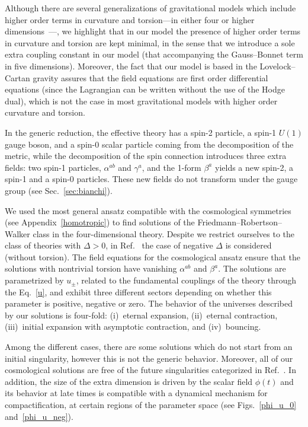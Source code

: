 \documentclass[aps,prd,12pt,superscriptaddress,showpacs,showkeys,reprint,nofootinbib]{revtex4-1}
\begin{document}
Although there are several generalizations of gravitational models
which include higher order terms in curvature and torsion---in either
four or higher
dimensions~\cite{Puetzfeld:2004yg,Baekler:2011jt,Fabbri:2012qr}---, we
highlight that in our model the presence of higher order terms in
curvature and torsion are kept minimal, in the sense that we introduce
a sole extra coupling constant in our model (that accompanying the
Gauss--Bonnet term in five dimensions).
Moreover, the fact that our model is based in the Lovelock--Cartan
gravity assures that the field equations are first order differential
equations (since the Lagrangian can be written without the use of the
Hodge dual), which is not the case in most gravitational models
with higher order curvature and torsion.

In the generic reduction, the effective theory has a spin-2 particle,
a spin-1 $U(1)$ gauge boson, and a spin-0 scalar particle coming from
the decomposition of the metric, while the decomposition of the spin
connection introduces three extra fields: two spin-1 particles,
$\alpha^{ab}$ and $\gamma^a$, and the 1-form $\beta^a$ yields a new
spin-2, a spin-1 and a spin-0 particles. These new fields do not
transform under the gauge group (see Sec.~\ref{sec:bianchi}). 

We used the most general ansatz compatible with the cosmological
symmetries (see Appendix~\ref{homotropic}) to find solutions of the
Friedmann--Robertson--Walker class in the four-dimensional
theory. Despite we restrict ourselves to the class of theories with
$\Delta > 0$, in Ref.~\cite{Canfora:2014iga} the case of negative
$\Delta$ is considered (without torsion). The field equations for the
cosmological ansatz ensure that the solutions with nontrivial torsion
have vanishing $\alpha^{ab}$ and $\beta^a$. The solutions are
parametrized by $u_\pm$, related to the fundamental couplings of the
theory through the Eq.~\eqref{u}, and exhibit three different sectors
depending on whether this parameter is positive, negative or zero. The
behavior of the universes described by our solutions is four-fold:
(i)~eternal expansion, (ii)~eternal contraction, (iii)~initial
expansion with asymptotic contraction, and (iv)~bouncing.

Among the different cases, there are some solutions which do not start
from an initial singularity, however this is not the generic
behavior. Moreover, all of our cosmological solutions are free of
the future singularities categorized in Ref.~\cite{Shojai:2015dpa}. In
addition, the size of the extra dimension is driven by the scalar
field $\phi(t)$ and its behavior at late times is compatible with a
dynamical mechanism for compactification, at certain regions of the
parameter space (see Figs.~\ref{phi_u_0} and~\ref{phi_u_neg}). 
\end{document}
